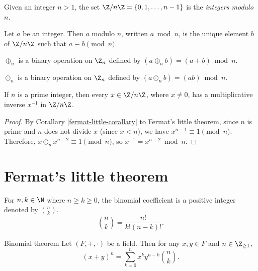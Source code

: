 \documentclass[12pt]{article}
\begin{document}
\begin{defn}\label{mod-n}
    Given an integer $n > 1$, the set $\Z/n\Z = \{0, 1, \ldots, n-1\}$ is the \emph{integers modulo $n$}.
\end{defn}

\begin{defn}\label{modulo}
    Let $a$ be an integer. Then $a$ modulo $n$, written $a \bmod n$, is the unique element $b$ of $\Z/n\Z$ such that $a \equiv b \pmod n$.
\end{defn}

\begin{defn}
    $\oplus_n$ is a binary operation on $\Z_n$ defined by $(a \oplus_n b) = (a + b)\bmod n$.
\end{defn}

\begin{defn}
    $\odot_n$ is a binary operation on $\Z_n$ defined by $(a \odot_n b) = (ab)\bmod n$.
\end{defn}

\begin{thm}\label{znz-prime-field}
    If $n$ is a prime integer, then every $x \in \Z/n\Z$, where $x \neq 0$, has a multiplicative inverse $x^{-1}$ in $\Z/n\Z$.
\end{thm}

\begin{proof}
    By Corallary \ref{fermat-little-corallary} to Fermat's little theorem, since $n$ is prime and $n$ does not divide $x$ (since $x < n$), we have $x^{n-1} \equiv 1 \pmod n$. Therefore, $x \odot_n x^{n-2} \equiv 1 \pmod n$, so $x^{-1} = x^{n-2} \bmod n$.
\end{proof}

\section{Fermat's little theorem}

\begin{defn}
    For $n, k \in \N$ where $n \geq k \geq 0$, the binomial coefficient is a positive integer denoted by $n \choose k$. \[{n \choose k} = \frac{n!}{k!(n-k)!}.\]
\end{defn}

\begin{thm}{Binomial theorem}\label{binomial-theorem}\proofbreak
    Let $(F, +, \cdot)$ be a field. Then for any $x, y \in F$ and $n \in \Z_{\geq 1}$, \[\left(x + y\right)^n = \sum_{k=0}^n x^ky^{n-k}{n \choose k}.\]
\end{thm}
\end{document}
